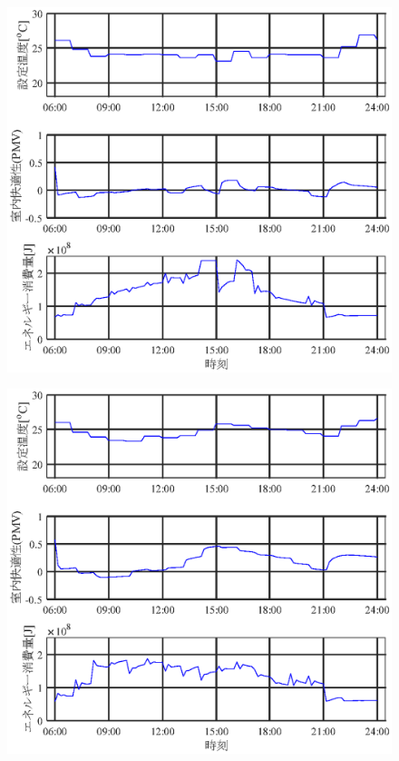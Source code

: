 \begin{figure}[htbp]
  \begin{center}
    \begin{minipage}{0.5\textwidth}
      \begin{center}
        \includegraphics[width=1.0\textwidth,keepaspectratio=true]{fig/sim_result_schedule_a.eps}\\\vspace{-2mm}{スケジュール A (室内快適性が最も良い解)}
      \end{center}
    \end{minipage}
    \begin{minipage}{0.5\textwidth}
      \begin{center}
        \includegraphics[width=1.0\textwidth,keepaspectratio=true]{fig/sim_result_schedule_b.eps}\\\vspace{-2mm}{スケジュール B (中間の解)}

\end{center}
\end{minipage}
\end{center}
\end{figure}

